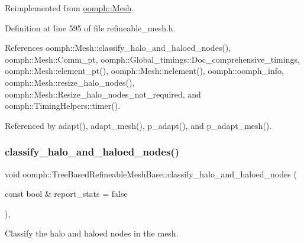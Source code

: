 Reimplemented from \hyperlink{classoomph_1_1Mesh_a595cfa652d75d9fbfc72a8252fe6782e}{oomph\+::\+Mesh}.



Definition at line 595 of file refineable\+\_\+mesh.\+h.



References oomph\+::\+Mesh\+::classify\+\_\+halo\+\_\+and\+\_\+haloed\+\_\+nodes(), oomph\+::\+Mesh\+::\+Comm\+\_\+pt, oomph\+::\+Global\+\_\+timings\+::\+Doc\+\_\+comprehensive\+\_\+timings, oomph\+::\+Mesh\+::element\+\_\+pt(), oomph\+::\+Mesh\+::nelement(), oomph\+::oomph\+\_\+info, oomph\+::\+Mesh\+::resize\+\_\+halo\+\_\+nodes(), oomph\+::\+Mesh\+::\+Resize\+\_\+halo\+\_\+nodes\+\_\+not\+\_\+required, and oomph\+::\+Timing\+Helpers\+::timer().



Referenced by adapt(), adapt\+\_\+mesh(), p\+\_\+adapt(), and p\+\_\+adapt\+\_\+mesh().

\mbox{\label{classoomph_1_1TreeBasedRefineableMeshBase_a0f155de75a38d3356fb925629c3ae7ad}} 
\subsubsection{\texorpdfstring{classify\+\_\+halo\+\_\+and\+\_\+haloed\+\_\+nodes()}{classify\_halo\_and\_haloed\_nodes()}\hspace{0.1cm}{\footnotesize\ttfamily [2/2]}}
{\footnotesize\ttfamily void oomph\+::\+Tree\+Based\+Refineable\+Mesh\+Base\+::classify\+\_\+halo\+\_\+and\+\_\+haloed\+\_\+nodes (\begin{DoxyParamCaption}\item[{const bool \&}]{report\+\_\+stats = {\ttfamily false} }\end{DoxyParamCaption})\hspace{0.3cm}{\ttfamily [inline]}, {\ttfamily [virtual]}}



Classify the halo and haloed nodes in the mesh. 



